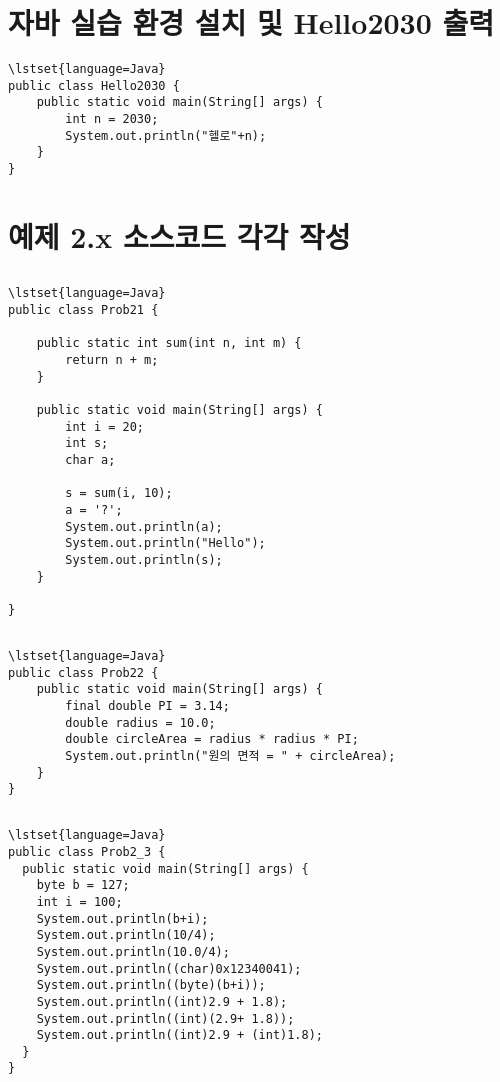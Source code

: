 \documentclass{article}
\title{JAVA 프로그래밍및실습 #1 과제 #1}
\author{박종현}
\date{April 2022}
\begin{document}
\maketitle

\section{자바 실습 환경 설치 및 Hello2030 출력}

\begin{lstlisting}
\lstset{language=Java}
public class Hello2030 {
	public static void main(String[] args) {
		int n = 2030;
		System.out.println("헬로"+n);
	}
}
\end{lstlisting}

\section{예제 2.x 소스코드 각각 작성}
\subsection{}
\begin{lstlisting}
\lstset{language=Java}
public class Prob21 {

	public static int sum(int n, int m) {
		return n + m;
	}
	
	public static void main(String[] args) {
		int i = 20;
		int s;
		char a;
		
		s = sum(i, 10);
		a = '?';
		System.out.println(a);
		System.out.println("Hello");
		System.out.println(s);
	}

}
\end{lstlisting}
\subsection{}
\begin{lstlisting}
\lstset{language=Java}
public class Prob22 {
	public static void main(String[] args) {
		final double PI = 3.14;
		double radius = 10.0;
		double circleArea = radius * radius * PI;
		System.out.println("원의 면적 = " + circleArea);
	} 
}
\end{lstlisting}
\subsection{}
\begin{lstlisting}
\lstset{language=Java}
public class Prob2_3 {
  public static void main(String[] args) {
    byte b = 127;
    int i = 100;
    System.out.println(b+i);
    System.out.println(10/4);
    System.out.println(10.0/4);
    System.out.println((char)0x12340041);
    System.out.println((byte)(b+i));
    System.out.println((int)2.9 + 1.8);
    System.out.println((int)(2.9+ 1.8));
    System.out.println((int)2.9 + (int)1.8);
  }
}
\end{lstlisting}
\end{document}
